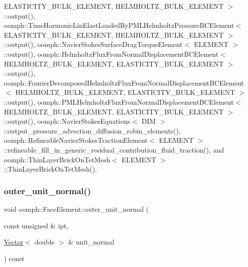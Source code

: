 E\+L\+A\+S\+T\+I\+C\+I\+T\+Y\+\_\+\+B\+U\+L\+K\+\_\+\+E\+L\+E\+M\+E\+N\+T, H\+E\+L\+M\+H\+O\+L\+T\+Z\+\_\+\+B\+U\+L\+K\+\_\+\+E\+L\+E\+M\+E\+N\+T $>$\+::output(), oomph\+::\+Time\+Harmonic\+Lin\+Elast\+Loaded\+By\+P\+M\+L\+Helmholtz\+Pressure\+B\+C\+Element$<$ E\+L\+A\+S\+T\+I\+C\+I\+T\+Y\+\_\+\+B\+U\+L\+K\+\_\+\+E\+L\+E\+M\+E\+N\+T, H\+E\+L\+M\+H\+O\+L\+T\+Z\+\_\+\+B\+U\+L\+K\+\_\+\+E\+L\+E\+M\+E\+N\+T $>$\+::output(), oomph\+::\+Navier\+Stokes\+Surface\+Drag\+Torque\+Element$<$ E\+L\+E\+M\+E\+N\+T $>$\+::output(), oomph\+::\+Helmholtz\+Flux\+From\+Normal\+Displacement\+B\+C\+Element$<$ H\+E\+L\+M\+H\+O\+L\+T\+Z\+\_\+\+B\+U\+L\+K\+\_\+\+E\+L\+E\+M\+E\+N\+T, E\+L\+A\+S\+T\+I\+C\+I\+T\+Y\+\_\+\+B\+U\+L\+K\+\_\+\+E\+L\+E\+M\+E\+N\+T $>$\+::output(), oomph\+::\+Fourier\+Decomposed\+Helmholtz\+Flux\+From\+Normal\+Displacement\+B\+C\+Element$<$ H\+E\+L\+M\+H\+O\+L\+T\+Z\+\_\+\+B\+U\+L\+K\+\_\+\+E\+L\+E\+M\+E\+N\+T, E\+L\+A\+S\+T\+I\+C\+I\+T\+Y\+\_\+\+B\+U\+L\+K\+\_\+\+E\+L\+E\+M\+E\+N\+T $>$\+::output(), oomph\+::\+P\+M\+L\+Helmholtz\+Flux\+From\+Normal\+Displacement\+B\+C\+Element$<$ H\+E\+L\+M\+H\+O\+L\+T\+Z\+\_\+\+B\+U\+L\+K\+\_\+\+E\+L\+E\+M\+E\+N\+T, E\+L\+A\+S\+T\+I\+C\+I\+T\+Y\+\_\+\+B\+U\+L\+K\+\_\+\+E\+L\+E\+M\+E\+N\+T $>$\+::output(), oomph\+::\+Navier\+Stokes\+Equations$<$ D\+I\+M $>$\+::output\+\_\+pressure\+\_\+advection\+\_\+diffusion\+\_\+robin\+\_\+elements(), oomph\+::\+Refineable\+Navier\+Stokes\+Traction\+Element$<$ E\+L\+E\+M\+E\+N\+T $>$\+::refineable\+\_\+fill\+\_\+in\+\_\+generic\+\_\+residual\+\_\+contribution\+\_\+fluid\+\_\+traction(), and oomph\+::\+Thin\+Layer\+Brick\+On\+Tet\+Mesh$<$ E\+L\+E\+M\+E\+N\+T $>$\+::\+Thin\+Layer\+Brick\+On\+Tet\+Mesh().

\mbox{\label{classoomph_1_1FaceElement_ada4480c304100898d0c45be6d3ce181f}} 
\subsubsection{\texorpdfstring{outer\+\_\+unit\+\_\+normal()}{outer\_unit\_normal()}\hspace{0.1cm}{\footnotesize\ttfamily [2/2]}}
{\footnotesize\ttfamily void oomph\+::\+Face\+Element\+::outer\+\_\+unit\+\_\+normal (\begin{DoxyParamCaption}\item[{const unsigned \&}]{ipt,  }\item[{\hyperlink{classoomph_1_1Vector}{Vector}$<$ double $>$ \&}]{unit\+\_\+normal }\end{DoxyParamCaption}) const}



